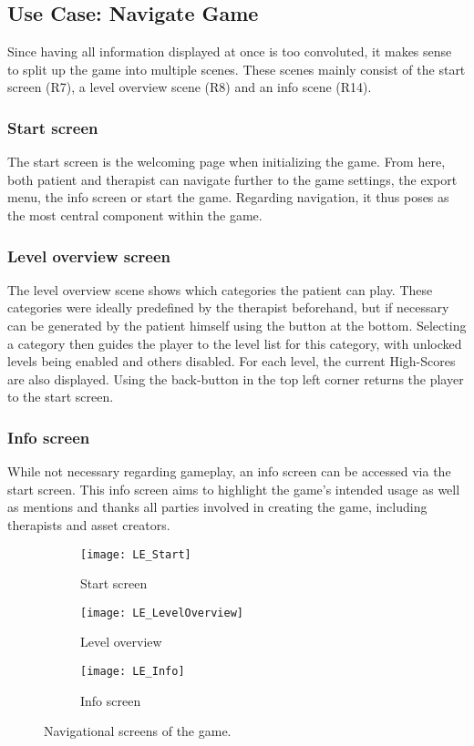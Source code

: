\documentclass[draft,final]{vutinfth} %
\begin{document}
\subsection{Use Case: Navigate Game} 
Since having all information displayed at once is too convoluted, it makes sense to split up the game into multiple scenes. These scenes mainly consist of the start screen (R7), a level overview scene (R8) and an info scene (R14).

\subsubsection{Start screen}
The start screen is the welcoming page when initializing the game. From here, both patient and therapist can navigate further to the game settings, the export menu, the info screen or start the game. Regarding navigation, it thus poses as the most central component within the game.

\subsubsection{Level overview screen}
The level overview scene shows which categories the patient can play. These categories were ideally predefined by the therapist beforehand, but if necessary can be generated by the patient himself using the button at the bottom. Selecting a category then guides the player to the level list for this category, with unlocked levels being enabled and others disabled. For each level, the current High-Scores are also displayed. Using the back-button in the top left corner returns the player to the start screen.

\subsubsection{Info screen}
While not necessary regarding gameplay, an info screen can be accessed via the start screen. This info screen aims to highlight the game's intended usage as well as mentions and thanks all parties involved in creating the game, including therapists and asset creators.

\begin{figure}
\begin{center}
\begin{subfigure}{.9\textwidth}
  \centering
  \texttt{[image: LE\_Start]}
  \caption{Start screen}
\end{subfigure}
\begin{subfigure}{.9\textwidth}
  \centering
  \texttt{[image: LE\_LevelOverview]}
  \caption{Level overview}
\end{subfigure}
\begin{subfigure}{.9\textwidth}
  \centering
  \texttt{[image: LE\_Info]}
  \caption{Info screen}
\end{subfigure}
\caption{Navigational screens of the game.}
\end{center}
\end{figure}
\end{document}
